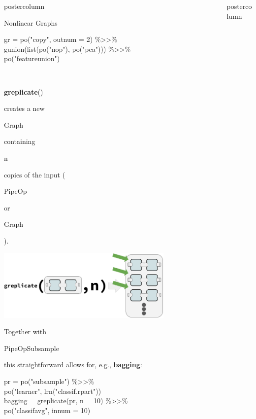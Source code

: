 \documentclass{beamer}
\newcommand{\codeinline}[1]{\begin{codeboxinline}#1\end{codeboxinline}}
\begin{document}
\begin{frame}[fragile]{}
\begin{columns}
\begin{column}{.245\textwidth}
\begin{beamercolorbox}[center]{postercolumn}
\begin{minipage}{.98\textwidth}
{\begin{myblock}{Nonlinear Graphs}
              \begin{codeboxexample}
						    {\footnotesize
                  gr = po("copy", outnum = 2) \%>{}>\%\\
                  \hspace*{1ex} gunion(list(po("nop"), po("pca"))) \%>{}>\%\\
                  \hspace*{1ex} po("featureunion")}
              \end{codeboxexample}
              \ \\
              \codeinline{\textbf{greplicate}()} creates a new \codeinline{Graph} containing \codeinline{n} copies of the input (\codeinline{PipeOp} or \codeinline{Graph}).
              \begin{center}
                \includegraphics[width=0.75\textwidth]{img/greplicate.png}
              \end{center}
              Together with \codeinline{PipeOpSubsample} this straightforward allows for, e.g., \textbf{bagging}:
              \begin{codeboxexample}
						    {\footnotesize
                  pr = po("subsample") \%>{}>\%\\
                  \hspace*{1ex} po("learner", lrn("classif.rpart"))\\
                  bagging = greplicate(pr, n = 10) \%>{}>\%\\
                  \hspace*{1ex} po("classifavg", innum = 10)}
					    \end{codeboxexample}
            \end{myblock}
						\vfill}
				\end{minipage}
			\end{beamercolorbox}
		\end{column}
    \begin{column}{.245\textwidth}
			\begin{beamercolorbox}[center]{postercolumn}

\end{beamercolorbox}
\end{column}
\end{columns}
\end{frame}
\end{document}
